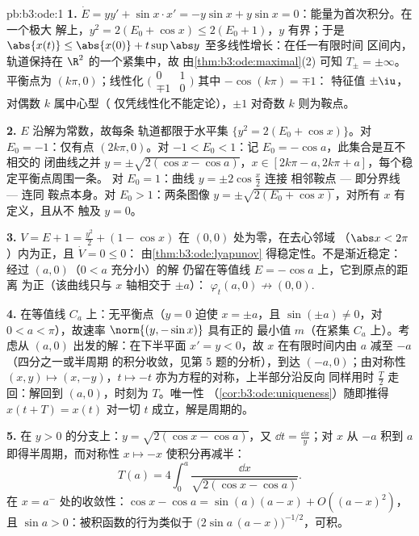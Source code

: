\begin{solution}{pb:b3:ode:1}
\textbf{1.} $\dot E = yy' + \sin x\cdot x' = -y\sin x +
y\sin x = 0$：能量为首次积分。在一个极大
解上，$y^2 = 2(E_0 + \cos x) \leq 2(E_0 + 1)$，$y$
有界；于是 $\abs{x(t)} \leq \abs{x(0)} +
t\sup\abs y$ 至多线性增长：在任一有限时间
区间内，轨道保持在 $\R^2$ 的一个紧集中，故
由\cref{thm:b3:ode:maximal}(2) 可知 $T_\pm = \pm\infty$。
平衡点为 $(k\pi, 0)$；线性化
$\bigl(\begin{smallmatrix}0&1\\
\mp1&0\end{smallmatrix}\bigr)$ 其中 $-\cos(k\pi) = \mp1$：
特征值 $\pm\iu$，对偶数 $k$ 属中心型（
仅凭线性化不能定论），$\pm1$ 对奇数 $k$ 则为鞍点。

\textbf{2.} $E$ 沿解为常数，故每条
轨道都限于水平集 $\{y^2 = 2(E_0 + \cos x)\}$。对
$E_0 = -1$：仅有点 $(2k\pi, 0)$。对 $-1 < E_0 <
1$：记 $E_0 = -\cos a$，此集合是互不相交的
闭曲线之并 $y = \pm\sqrt{2(\cos x - \cos a)}$，$x \in
[2k\pi - a, 2k\pi + a]$，每个稳定平衡点周围一条。
对 $E_0 = 1$：曲线 $y = \pm2\cos\frac x2$ 连接
相邻鞍点 --- 即分界线 --- 连同
鞍点本身。对 $E_0 > 1$：两条图像 $y =
\pm\sqrt{2(E_0 + \cos x)}$，对所有 $x$ 有定义，且从不
触及 $y = 0$。

\textbf{3.} $V = E + 1 = \frac{y^2}2 + (1 - \cos x)$
在 $(0,0)$ 处为零，在去心邻域
（$\abs x < 2\pi$）内为正，且 $\dot V = 0 \leq 0$：
由\cref{thm:b3:ode:lyapunov} 得稳定性。不是渐近稳定：
经过 $(a, 0)$（$0 < a$ 充分小）的解
仍留在等值线 $E = -\cos a$ 上，它到原点的距离
为正（该曲线只与 $x$ 轴相交于 $\pm a$）：
$\varphi_t(a, 0) \not\to (0,0)$.

\textbf{4.} 在等值线 $C_a$ 上：无平衡点（$y = 0$
迫使 $x = \pm a$，且 $\sin(\pm a) \neq 0$，对 $0 < a <
\pi$），故速率 $\norm{(y, -\sin x)}$ 具有正的
最小值 $m$（在紧集 $C_a$ 上）。考虑从
$(a, 0)$ 出发的解：在下半平面 $x' = y < 0$，故 $x$
在有限时间内由 $a$ 减至 $-a$（四分之一或半周期
的积分收敛，见第 5 题的分析），到达
$(-a, 0)$；由对称性 $(x, y) \mapsto (x, -y)$，$t
\mapsto -t$ 亦为方程的对称，上半部分沿反向
同样用时 $\frac T2$ 走回：解回到
$(a, 0)$，时刻为 $T$。唯一性
（\cref{cor:b3:ode:uniqueness}）随即推得 $x(t + T) =
x(t)$ 对一切 $t$ 成立，解是周期的。

\textbf{5.} 在 $y > 0$ 的分支上：$y = \sqrt{2(\cos x
- \cos a)}$，又 $\dd t = \frac{\dd x}{y}$；对 $x$
从 $-a$ 积到 $a$ 即得半周期，而对称性 $x
\mapsto -x$ 使积分再减半：
\[
T(a) = 4\int_0^a\frac{\dd x}{\sqrt{2(\cos x - \cos a)}} .
\]
在 $x = a^-$ 处的收敛性：$\cos x - \cos a = \sin(a)(a - x) +
O((a-x)^2)$，且 $\sin a > 0$：被积函数的行为类似于
$\bigl(2\sin a\,(a - x)\bigr)^{-1/2}$，可积。


\end{solution}
